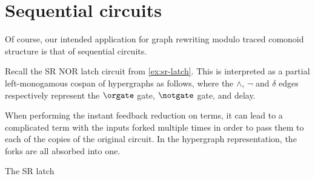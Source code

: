 \section{Sequential circuits}

Of course, our intended application for graph rewriting modulo traced
comonoid structure is that of sequential circuits.

\begin{example}
    Recall the SR NOR latch circuit from \cref{ex:sr-latch}.
    This is interpreted as a partial left-monogamous cospan of hypergraphs as
    follows, where the \(\wedge\), \(\neg\) and \(\delta\) edges respectively
    represent the \(\orgate\) gate, \(\notgate\) gate, and delay.
    \begin{center}
    \end{center}
\end{example}

When performing the instant feedback reduction on terms, it can lead to a
complicated term with the inputs forked multiple times in order to pass them to
each of the copies of the original circuit.
In the hypergraph representation, the forks are all absorbed into one.

\begin{example}
    \begin{center}
        
    \end{center}
\end{example}

\begin{example}
    The SR latch
\end{example}



